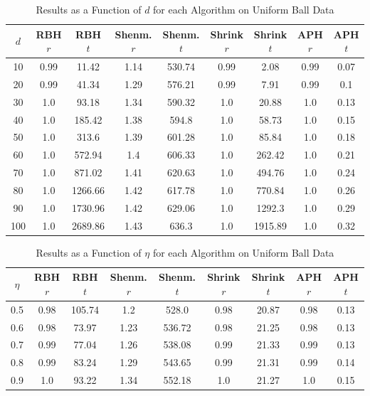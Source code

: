 \documentclass[11pt,twoside]{report}
\theoremstyle{definition}
\numberwithin{theorem}{section}
\numberwithin{definition}{section}
\numberwithin{lemma}{section}
\numberwithin{proposition}{section}
\numberwithin{equation}{section}
\numberwithin{figure}{section}
\begin{document}
\begin{appendices}
    \begin{table}[ht]
        \centering
        \begin{tabular}{|c||c|c||c|c||c|c||c|c|} \hline
            $d$&RBH $r$&RBH $t$&Shenm. $r$&Shenm. $t$&Shrink $r$&Shrink $t$&APH $r$&APH $t$ \\ \hline
            10&0.99&11.42&1.14&530.74&0.99&2.08&0.99&0.07 \\
            20&0.99&41.34&1.29&576.21&0.99&7.91&0.99&0.1 \\
            30&1.0&93.18&1.34&590.32&1.0&20.88&1.0&0.13 \\
            40&1.0&185.42&1.38&594.8&1.0&58.73&1.0&0.15 \\
            50&1.0&313.6&1.39&601.28&1.0&85.84&1.0&0.18 \\
            60&1.0&572.94&1.4&606.33&1.0&262.42&1.0&0.21 \\
            70&1.0&871.02&1.41&620.63&1.0&494.76&1.0&0.24 \\
            80&1.0&1266.66&1.42&617.78&1.0&770.84&1.0&0.26 \\
            90&1.0&1730.96&1.42&629.06&1.0&1292.3&1.0&0.29 \\
            100&1.0&2689.86&1.43&636.3&1.0&1915.89&1.0&0.32 \\ \hline
        \end{tabular}
        \caption{Results as a Function of $d$ for each Algorithm on Uniform Ball Data}
        \label{tab:uniform_ball_table_d}
    \end{table}
    
    \begin{table}[ht]
        \centering
        \begin{tabular}{|c||c|c||c|c||c|c||c|c|} \hline
            $\eta$&RBH $r$&RBH $t$&Shenm. $r$&Shenm. $t$&Shrink $r$&Shrink $t$&APH $r$&APH $t$ \\ \hline
            0.5&0.98&105.74&1.2&528.0&0.98&20.87&0.98&0.13 \\
            0.6&0.98&73.97&1.23&536.72&0.98&21.25&0.98&0.13 \\
            0.7&0.99&77.04&1.26&538.08&0.99&21.33&0.99&0.13 \\
            0.8&0.99&83.24&1.29&543.65&0.99&21.31&0.99&0.14 \\
            0.9&1.0&93.22&1.34&552.18&1.0&21.27&1.0&0.15 \\ \hline
        \end{tabular}
        \caption{Results as a Function of $\eta$ for each Algorithm on Uniform Ball Data}
        \label{tab:uniform_ball_table_eta}
    \end{table}
    \clearpage
    

\end{appendices}
\end{document}

